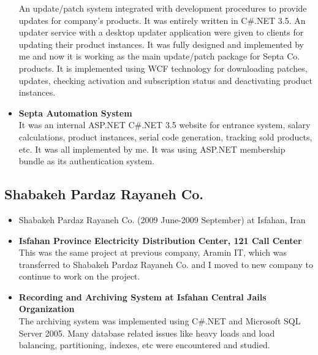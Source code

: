 \documentclass[12pt,a4paper]{article}
\begin{document}
\begin{itemize}
			An update/patch system integrated with development procedures to provide updates for company's products. It was entirely written in C\#.NET 3.5. An updater service with a desktop updater application were given to clients for updating their product instances. It was fully designed and implemented by me and now it is working as the main update/patch package for Septa Co. products. It is implemented using WCF technology for downloading patches, updates, checking activation and subscription status and deactivating product instances. \\
			\item \small \textbf{Septa Automation System} \\
			It was an internal ASP.NET C\#.NET 3.5 website for entrance system, salary calculations, product instances, serial code generation, tracking sold products, etc. It was all implemented by me. It was using ASP.NET membership bundle as its authentication system.
		\end{itemize}
	
	\subsection{Shabakeh Pardaz Rayaneh Co.}
		\begin{itemize}
			\item Shabakeh Pardaz Rayaneh Co. (2009 June-2009 September) at Isfahan, Iran
			\item \small \textbf{Isfahan Province Electricity Distribution Center, 121 Call Center} \\
			This was the same project at previous company, Aramin IT, which was transferred to Shabakeh Pardaz Rayaneh Co. and I moved to new company to continue to work on the project. \\
			\item \small \textbf{Recording and Archiving System at Isfahan Central Jails Organization} \\
			The archiving system was implemented using C\#.NET and Microsoft SQL Server 2005. Many database related issues like heavy loads and load balancing, partitioning, indexes, etc were encountered and studied.
		\end{itemize}
		
\end{document}
